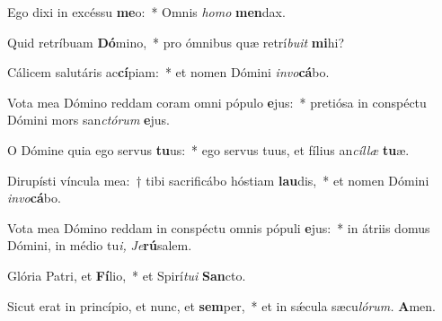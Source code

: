 \item Ego dixi in excéssu \textbf{me}o:~* Omnis \textit{homo} \textbf{men}dax.
\item Quid retríbuam \textbf{Dó}mino,~* pro ómnibus quæ retrí\textit{buit} \textbf{mi}hi?
\item Cálicem salutáris ac\textbf{cí}piam:~* et nomen Dómini \textit{invo}\textbf{cá}bo.
\item Vota mea Dómino reddam coram omni pópulo \textbf{e}jus:~* pretiósa in conspéctu Dómini mors san\textit{ctórum} \textbf{e}jus.
\item O Dómine quia ego servus \textbf{tu}us:~* ego servus tuus, et fílius an\textit{cíllæ} \textbf{tu}æ.
\item Dirupísti víncula mea:~† tibi sacrificábo hóstiam \textbf{lau}dis,~* et nomen Dómini \textit{invo}\textbf{cá}bo.
\item Vota mea Dómino reddam in conspéctu omnis pópuli \textbf{e}jus:~* in átriis domus Dómini, in médio tu\tinyhspace\textit{i,} \hspace{0.02em}\textit{Je}\textbf{rú}salem.
\item Glória Patri, et \textbf{Fí}lio,~* et Spirí\tinyhspace\textit{tui} \textbf{San}cto.
\item Sicut erat in princípio, et nunc, et \textbf{sem}per,~* et in sǽcula sæcu\tinyhspace\textit{lórum.} \textbf{A}men.
